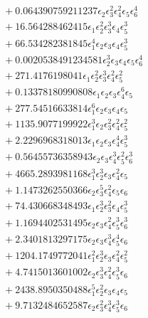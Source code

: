 \documentclass[10pt]{article}
\begin{document}
\begin{align*}
&{}  + 0.064390759211237 \epsilon_{2} \epsilon_{3}^{2} \epsilon_{4}^{2} \epsilon_{5} \epsilon_{6}^{4} \\
&{}  + 16.564288462415 \epsilon_{1} \epsilon_{2}^{2} \epsilon_{3}^{3} \epsilon_{4} \epsilon_{5}^{3} \\
&{}  + 66.534282381845 \epsilon_{1}^{4} \epsilon_{2} \epsilon_{3} \epsilon_{4} \epsilon_{5}^{3} \\
&{}  + 0.0020538491234581 \epsilon_{2}^{3} \epsilon_{3} \epsilon_{4} \epsilon_{5} \epsilon_{6}^{4} \\
&{}  + 271.4176198041 \epsilon_{1} \epsilon_{2}^{2} \epsilon_{3}^{3} \epsilon_{4}^{2} \epsilon_{5}^{2} \\
&{}  + 0.13378180990808 \epsilon_{1} \epsilon_{2} \epsilon_{3} \epsilon_{4}^{6} \epsilon_{5} \\
&{}  + 277.54516633814 \epsilon_{1}^{6} \epsilon_{2} \epsilon_{3} \epsilon_{4} \epsilon_{5} \\
&{}  + 1135.9077199922 \epsilon_{1}^{3} \epsilon_{2} \epsilon_{3}^{2} \epsilon_{4}^{2} \epsilon_{5}^{2} \\
&{}  + 2.2296968318013 \epsilon_{1} \epsilon_{2} \epsilon_{3} \epsilon_{4}^{4} \epsilon_{5}^{3} \\
&{}  + 0.56455736358943 \epsilon_{2} \epsilon_{3} \epsilon_{4}^{3} \epsilon_{5}^{2} \epsilon_{6}^{3} \\
&{}  + 4665.2893981168 \epsilon_{1}^{3} \epsilon_{2}^{3} \epsilon_{3} \epsilon_{4}^{2} \epsilon_{5} \\
&{}  + 1.1473262550366 \epsilon_{2} \epsilon_{3}^{5} \epsilon_{4}^{2} \epsilon_{5} \epsilon_{6} \\
&{}  + 74.430668348493 \epsilon_{1} \epsilon_{2}^{3} \epsilon_{3}^{2} \epsilon_{4} \epsilon_{5}^{3} \\
&{}  + 1.1694402531495 \epsilon_{2} \epsilon_{3} \epsilon_{4}^{2} \epsilon_{5}^{3} \epsilon_{6}^{3} \\
&{}  + 2.3401813297175 \epsilon_{2} \epsilon_{3} \epsilon_{4}^{3} \epsilon_{5}^{4} \epsilon_{6} \\
&{}  + 1204.1749772041 \epsilon_{1}^{2} \epsilon_{2}^{3} \epsilon_{3} \epsilon_{4}^{2} \epsilon_{5}^{2} \\
&{}  + 4.7415013601002 \epsilon_{2} \epsilon_{3}^{3} \epsilon_{4}^{2} \epsilon_{5}^{3} \epsilon_{6} \\
&{}  + 2438.8950350488 \epsilon_{1}^{5} \epsilon_{2}^{2} \epsilon_{3} \epsilon_{4} \epsilon_{5} \\
&{}  + 9.7132484652587 \epsilon_{2} \epsilon_{3}^{2} \epsilon_{4}^{3} \epsilon_{5}^{3} \epsilon_{6} \\

\end{align*}
\end{document}
